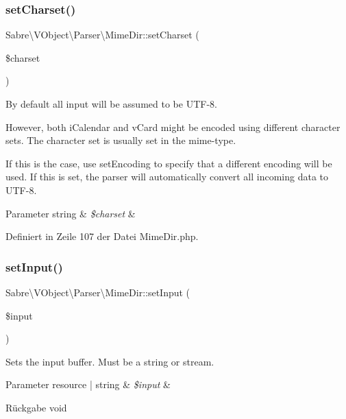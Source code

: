\subsubsection{\texorpdfstring{set\+Charset()}{setCharset()}}
{\footnotesize\ttfamily Sabre\textbackslash{}\+V\+Object\textbackslash{}\+Parser\textbackslash{}\+Mime\+Dir\+::set\+Charset (\begin{DoxyParamCaption}\item[{}]{\$charset }\end{DoxyParamCaption})}

By default all input will be assumed to be U\+T\+F-\/8.

However, both i\+Calendar and v\+Card might be encoded using different character sets. The character set is usually set in the mime-\/type.

If this is the case, use set\+Encoding to specify that a different encoding will be used. If this is set, the parser will automatically convert all incoming data to U\+T\+F-\/8.


\begin{DoxyParams}[1]{Parameter}
string & {\em \$charset} & \\
\hline
\end{DoxyParams}


Definiert in Zeile 107 der Datei Mime\+Dir.\+php.

\mbox{\label{class_sabre_1_1_v_object_1_1_parser_1_1_mime_dir_a723e7cf41fe0b461a89169ed57b23947}} 
\subsubsection{\texorpdfstring{set\+Input()}{setInput()}}
{\footnotesize\ttfamily Sabre\textbackslash{}\+V\+Object\textbackslash{}\+Parser\textbackslash{}\+Mime\+Dir\+::set\+Input (\begin{DoxyParamCaption}\item[{}]{\$input }\end{DoxyParamCaption})}

Sets the input buffer. Must be a string or stream.


\begin{DoxyParams}[1]{Parameter}
resource | string & {\em \$input} & \\
\hline
\end{DoxyParams}
\begin{DoxyReturn}{Rückgabe}
void 
\end{DoxyReturn}


